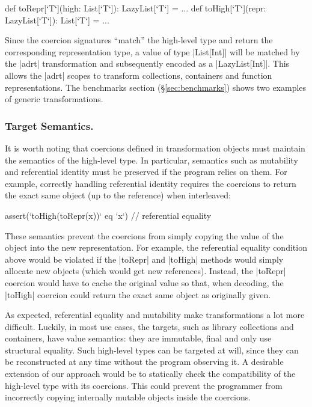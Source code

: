 \begin{lstlisting-nobreak}
  def toRepr[`T`](high: List[`T`]): LazyList[`T`] = ...
  def toHigh[`T`](repr: LazyList[`T`]): List[`T`] = ...
\end{lstlisting-nobreak}

Since the coercion signatures ``match'' the high-level type and return the corresponding representation type, a value of type |List[Int]| will be matched by the |adrt| transformation and subsequently encoded as a |LazyList[Int]|. This allows the |adrt| scopes to transform collections, containers and function representations. The benchmarks section (\S\ref{sec:benchmarks}) shows two examples of generic transformations.

\vspace{0.4em}
\subsubsection{Target Semantics.} It is worth noting that coercions defined in transformation objects must maintain the semantics of the high-level type. In particular, semantics such as mutability and referential identity must be preserved if the program relies on them. For example, correctly handling referential identity requires the coercions to return the exact same object (up to the reference) when interleaved:

\begin{lstlisting-nobreak}
assert(`toHigh(toRepr(x))` eq `x`) // referential equality
\end{lstlisting-nobreak}

These semantics prevent the coercions from simply copying the value of the object into the new representation.
For example, the referential equality condition above would be violated if the |toRepr| and |toHigh| methods would simply allocate new objects (which would get new references). Instead, the |toRepr| coercion would have to cache the original value so that, when decoding, the |toHigh| coercion could return the exact same object as originally given.

As expected, referential equality and mutability make transformations a lot more difficult. Luckily, in most use cases, the targets, such as library collections and containers, have value semantics: they are immutable, final and only use structural equality. Such high-level types can be targeted at will, since they can be reconstructed at any time without the program observing it. A desirable extension of our approach would be to statically check the compatibility of the high-level type with its coercions. This could prevent the programmer from incorrectly copying internally mutable objects inside the coercions.

